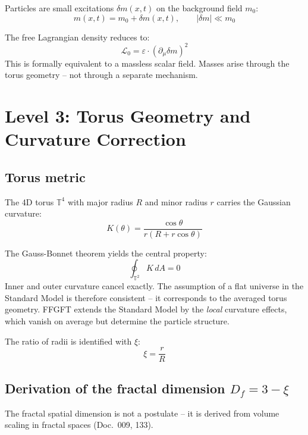 Particles are small excitations $\delta m(x,t)$ on the background field $m_0$:
\begin{equation}
    m(x,t) = m_0 + \delta m(x,t), \qquad |\delta m| \ll m_0
\end{equation}

The free Lagrangian density reduces to:
\begin{equation}
    \mathcal{L}_0 = \varepsilon \cdot (\partial_\mu \delta m)^2
    \label{eq:L0}
\end{equation}
This is formally equivalent to a massless scalar field. Masses
arise through the torus geometry -- not through a separate mechanism.

\section{Level 3: Torus Geometry and Curvature Correction}

\subsection{Torus metric}

The 4D torus $\mathbb{T}^4$ with major radius $R$ and minor radius $r$
carries the Gaussian curvature:
\begin{equation}
    K(\theta) = \frac{\cos\theta}{r(R + r\cos\theta)}
\end{equation}

The Gauss-Bonnet theorem yields the central property:
\begin{equation}
    \oint_{\mathbb{T}^2} K \, dA = 0
\end{equation}
Inner and outer curvature cancel exactly. The assumption of a flat
universe in the Standard Model is therefore consistent -- it corresponds
to the averaged torus geometry. FFGFT extends the Standard Model by
the \emph{local} curvature effects, which vanish on average but
determine the particle structure.

The ratio of radii is identified with $\xi$:
\begin{equation}
    \xi = \frac{r}{R}
\end{equation}

\subsection{Derivation of the fractal dimension \texorpdfstring{$D_f = 3 - \xi$}{Df = 3 - xi}}

The fractal spatial dimension is not a postulate -- it is derived
from volume scaling in fractal spaces (Doc.~009, 133).

